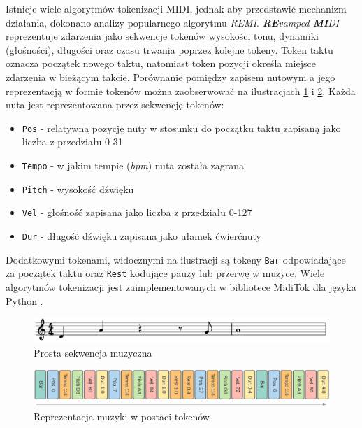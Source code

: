 \documentclass[data-science]{agh-wi} %
\begin{document}
Istnieje wiele algorytmów tokenizacji MIDI, jednak aby przedstawić mechanizm działania, dokonano analizy popularnego algorytmu \textit{REMI}. \textit{\textbf{RE}vamped \textbf{MI}DI} reprezentuje zdarzenia jako sekwencje tokenów wysokości tonu, dynamiki (głośności), długości oraz czasu trwania poprzez kolejne tokeny. Token taktu oznacza początek nowego taktu, natomiast token pozycji określa miejsce zdarzenia w bieżącym takcie. Porównanie pomiędzy zapisem nutowym a jego reprezentacją w formie tokenów można zaobserwować na ilustracjach \ref*{fig:remi_notes} i \ref*{fig:remi_tokens}. Każda nuta jest reprezentowana przez sekwencję tokenów:
\begin{itemize}
    \item \texttt{Pos} - relatywną pozycję nuty w stosunku do początku taktu zapisaną jako liczba z przedziału 0-31
    \item \texttt{Tempo} - w jakim tempie (\textit{bpm}) nuta została zagrana
    \item \texttt{Pitch} - wysokość dźwięku
    \item \texttt{Vel} - głośność zapisana jako liczba z przedziału 0-127
    \item \texttt{Dur} - długość dźwięku zapisana jako ułamek ćwierćnuty
\end{itemize}
Dodatkowymi tokenami, widocznymi na ilustracji są tokeny \texttt{Bar} odpowiadające za początek taktu oraz \texttt{Rest} kodujące pauzy lub przerwę w muzyce. Wiele algorytmów tokenizacji jest zaimplementowanych w bibliotece MidiTok dla języka Python \cite{miditok2021}.

\begin{figure}[ht!]
    \begin{center}
        \includegraphics[width=0.9\linewidth]{./img/tokenizer_notes.pdf}
    \end{center}
    \caption{Prosta sekwencja muzyczna}\label{fig:remi_notes}
\end{figure}

\begin{figure}[ht!]
    \begin{center}
        \includegraphics[width=0.9\linewidth]{./img/remi.png}
    \end{center}
    \caption{Reprezentacja muzyki w postaci tokenów}\label{fig:remi_tokens}
\end{figure}
\end{document}
